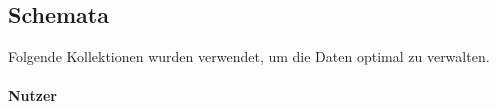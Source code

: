 \subsection{Schemata}
Folgende Kollektionen wurden verwendet, um die Daten optimal zu verwalten.

\paragraph{Nutzer}
\begin{center}
    \begin{tabularx}{\textwidth}{ |X|X|X| } 
    \end{tabularx}
\end{center}


